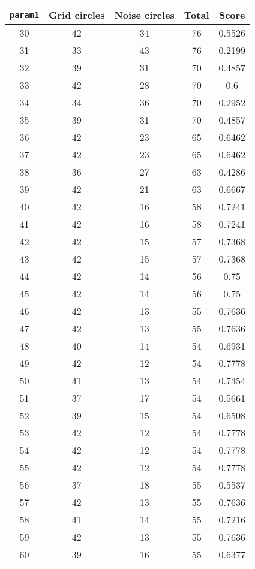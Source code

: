 \documentclass[letterpaper, 12pt]{article}
\begin{document}
\begin{longtable}{|c|c|c|c|c|}
\hline
\textbf{\texttt{param1}} & \textbf{Grid circles} & \textbf{Noise circles} & \textbf{Total} & \textbf{Score} \\
\hline
30 & 42 & 34 & 76 & 0.5526 \\
\hline
31 & 33 & 43 & 76 & 0.2199 \\
\hline
32 & 39 & 31 & 70 & 0.4857 \\
\hline
33 & 42 & 28 & 70 & 0.6 \\
\hline
34 & 34 & 36 & 70 & 0.2952 \\
\hline
35 & 39 & 31 & 70 & 0.4857 \\
\hline
36 & 42 & 23 & 65 & 0.6462 \\
\hline
37 & 42 & 23 & 65 & 0.6462 \\
\hline
38 & 36 & 27 & 63 & 0.4286 \\
\hline
39 & 42 & 21 & 63 & 0.6667 \\
\hline
40 & 42 & 16 & 58 & 0.7241 \\
\hline
41 & 42 & 16 & 58 & 0.7241 \\
\hline
42 & 42 & 15 & 57 & 0.7368 \\
\hline
43 & 42 & 15 & 57 & 0.7368 \\
\hline
44 & 42 & 14 & 56 & 0.75 \\
\hline
45 & 42 & 14 & 56 & 0.75 \\
\hline
46 & 42 & 13 & 55 & 0.7636 \\
\hline
47 & 42 & 13 & 55 & 0.7636 \\
\hline
48 & 40 & 14 & 54 & 0.6931 \\
\hline
49 & 42 & 12 & 54 & 0.7778 \\
\hline
50 & 41 & 13 & 54 & 0.7354 \\
\hline
51 & 37 & 17 & 54 & 0.5661 \\
\hline
52 & 39 & 15 & 54 & 0.6508 \\
\hline
53 & 42 & 12 & 54 & 0.7778 \\
\hline
54 & 42 & 12 & 54 & 0.7778 \\
\hline
55 & 42 & 12 & 54 & 0.7778 \\
\hline
56 & 37 & 18 & 55 & 0.5537 \\
\hline
57 & 42 & 13 & 55 & 0.7636 \\
\hline
58 & 41 & 14 & 55 & 0.7216 \\
\hline
59 & 42 & 13 & 55 & 0.7636 \\
\hline
60 & 39 & 16 & 55 & 0.6377 \\

\end{longtable}
\end{document}
